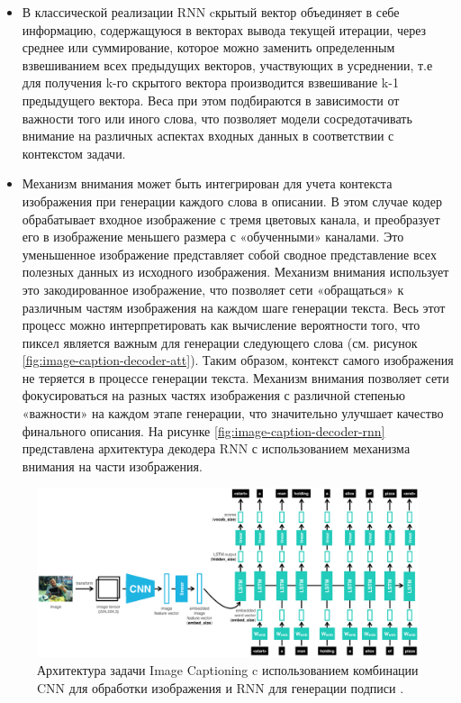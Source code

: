 \documentclass[a4paper,12pt]{extarticle}
\begin{document}
\begin{itemize}
	\item В классической реализации RNN cкрытый вектор объединяет в себе информацию, содержащуюся в векторах вывода текущей итерации, через среднее или суммирование, которое можно заменить определенным взвешиванием всех предыдущих векторов, участвующих в усреднении, т.е для получения k-го скрытого вектора производится взвешивание k-1 предыдущего вектора. Веса при этом подбираются в зависимости от важности того или иного слова, что позволяет модели сосредотачивать внимание на различных аспектах входных данных в соответствии с контекстом задачи.
	\item Механизм внимания может быть интегрирован для учета контекста изображения при генерации каждого слова в описании. В этом случае кодер обрабатывает входное изображение с тремя цветовых канала, и преобразует его в изображение меньшего размера с «обученными» каналами. Это уменьшенное изображение представляет собой сводное представление всех полезных данных из исходного изображения. Механизм внимания использует это закодированное изображение, что позволяет сети «обращаться» к различным частям изображения на каждом шаге генерации текста. Весь этот процесс можно интерпретировать как вычисление вероятности того, что пиксел является важным для генерации следующего слова (см. рисунок \ref{fig:image-caption-decoder-att}). Таким образом, контекст самого изображения не теряется в процессе генерации текста. Механизм внимания позволяет сети фокусироваться на разных частях изображения с различной степенью «важности» на каждом этапе генерации, что значительно улучшает качество финального описания. На рисунке \ref{fig:image-caption-decoder-rnn} представлена архитектура декодера RNN с использованием механизма внимания на части изображения.
\end{itemize}

\begin{figure}[ht]
	\centering
	\includegraphics[scale=0.2]{image-captioning-cnn-rnn.png}
	\caption{Архитектура задачи Image Captioning c использованием комбинации CNN для обработки изображения и RNN для генерации подписи \cite{arch-cnn-rnn-image-captioning}.}
	\label{fig:image-caption-cnn-rnn}
\end{figure}
\end{document}
